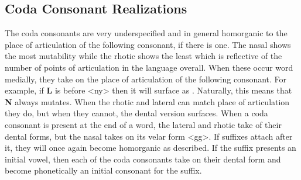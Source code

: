   \subsection{Coda Consonant Realizations}
  The coda consonants are very underspecified and in general homorganic to the place of articulation of the following consonant, if there is one. The nasal shows the most mutability while the rhotic shows the least which is reflective of the number of points of articulation in the language overall.
  When these occur word medially, they take on the place of articulation of the following consonant. For example, if \textbf{L} is before <ny> then it will surface as \phonemic{\palatall}. Naturally, this means that \textbf{N} always mutates. When the rhotic and lateral can match place of articulation they do, but when they cannot, the dental version surfaces.
  When a coda consonant is present at the end of a word, the lateral and rhotic take of their dental forms, but the nasal takes on its velar form <gg>. If suffixes attach after it, they will once again become homorganic as described. If the suffix presents an initial vowel, then each of the coda consonants take on their dental form and become phonetically an initial consonant for the suffix.

